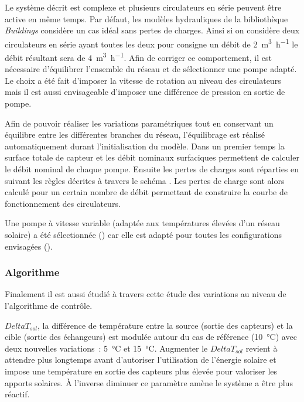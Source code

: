 Le système décrit est complexe et plusieurs circulateurs en série peuvent être active en même temps. Par défaut, les
modèles hydrauliques de la bibliothèque \textit{Buildings} considère un cas idéal
sans pertes de charges.
Ainsi si on considère deux circulateurs en série ayant toutes les deux pour consigne un débit de \SI[per-mode=symbol]{2}{\meter\cubed\per\hour}
le débit résultant sera de \SI[per-mode=symbol]{4}{\meter\cubed\per\hour}. Afin de corriger ce
comportement, il est nécessaire d’équilibrer l’ensemble du réseau et de sélectionner
une pompe adapté. Le choix a été fait d’imposer la vitesse de rotation au niveau
des circulateurs mais il est aussi envisageable d’imposer une différence de pression en
sortie de pompe.

Afin de pouvoir réaliser les variations paramétriques tout en conservant un équilibre
entre les différentes branches du réseau, l’équilibrage est réalisé automatiquement
durant l’initialisation du modèle. Dans un premier temps la surface totale de capteur et
les débit nominaux surfaciques permettent de calculer le débit nominal de chaque pompe. Ensuite les pertes
de charges sont réparties en suivant les règles décrites à travers le schéma .
Les pertes de charge sont alors calculé pour un certain nombre de débit permettant de construire
la courbe de fonctionnement des circulateurs.

Une pompe à vitesse variable (adaptée aux températures élevées d’un réseau solaire) a été sélectionnée ()
car elle est adapté pour toutes les configurations envisagées ().



\subsubsection{Algorithme} %
\label{ssub:variations_algorithmiques}
Finalement il est aussi étudié à travers cette étude des variations au niveau
de l’algorithme de contrôle.

$DeltaT_{sol}$, la différence de température entre la source (sortie des capteurs) et la cible (sortie des
échangeurs) est modulée autour du cas de référence (\SI{10}{\celsius}) avec deux nouvelles
variations~: \SI{5}{\celsius} et \SI{15}{\celsius}. Augmenter le $DeltaT_{sol}$ revient à
attendre plus longtemps avant d’autoriser l’utilisation de l’énergie solaire et impose une
température en sortie des capteurs plus élevée pour valoriser les apports solaires. À
l’inverse diminuer ce paramètre amène le système a être plus réactif.

